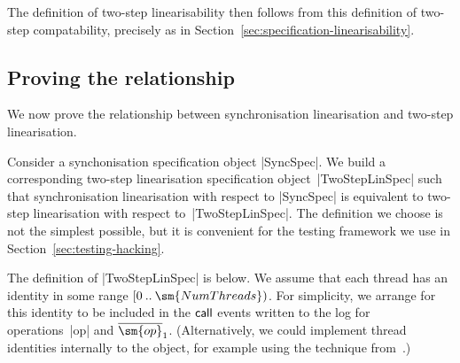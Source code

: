The definition of two-step linearisability then follows from this definition
of two-step compatability, precisely as in
Section~\ref{sec:specification-linearisability}.



\subsection{Proving the relationship}
\label{sec:twoStepLinSpec}

We now prove the relationship between synchronisation linearisation and
two-step linearisation.

Consider a synchonisation specification object |SyncSpec|.  We build a
corresponding two-step linearisation specification object~|TwoStepLinSpec|
such that synchronisation linearisation with respect to |SyncSpec| is
equivalent to two-step linearisation with respect to~|TwoStepLinSpec|.  The
definition we choose is not the simplest possible, but it is convenient for
the testing framework we use in Section~\ref{sec:testing-hacking}.  

The definition of |TwoStepLinSpec| is below.  We assume that each thread has
an identity in some range $\range 0 {\sm{NumThreads}}$.  For simplicity, we
arrange for this identity to be included in the $\mathsf{call}$ events written to the
log for operations~|op| and $\overline{\sm{op}}_1$.  (Alternatively, we
could implement thread identities internally to the object, for example using
the technique from~\cite[Appendix~A.2.4]{herlihy-shavit}.)

